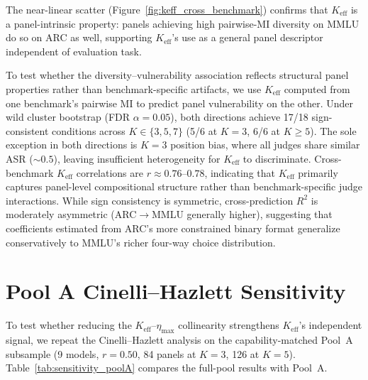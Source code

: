 The near-linear scatter (Figure~\ref{fig:keff_cross_benchmark}) confirms that $K_{\mathrm{eff}}$ is a panel-intrinsic property: panels achieving high pairwise-MI diversity on MMLU do so on ARC as well, supporting $K_{\mathrm{eff}}$'s use as a general panel descriptor independent of evaluation task.

To test whether the diversity--vulnerability association reflects structural panel properties rather than benchmark-specific artifacts, we use $K_{\mathrm{eff}}$ computed from one benchmark's pairwise MI to predict panel vulnerability on the other. Under wild cluster bootstrap (FDR $\alpha{=}0.05$), both directions achieve 17/18 sign-consistent conditions across $K \in \{3, 5, 7\}$ (5/6 at $K{=}3$, 6/6 at $K{\geq}5$). The sole exception in both directions is $K{=}3$ position bias, where all judges share similar ASR (${\sim}0.5$), leaving insufficient heterogeneity for $K_{\mathrm{eff}}$ to discriminate. Cross-benchmark $K_{\mathrm{eff}}$ correlations are $r{\approx}0.76$--$0.78$, indicating that $K_{\mathrm{eff}}$ primarily captures panel-level compositional structure rather than benchmark-specific judge interactions. While sign consistency is symmetric, cross-prediction $R^2$ is moderately asymmetric (ARC$\to$MMLU generally higher), suggesting that coefficients estimated from ARC's more constrained binary format generalize conservatively to MMLU's richer four-way choice distribution.

\FloatBarrier
\section{Pool A Cinelli--Hazlett Sensitivity}
\label{app:sensitivity_poolA}

To test whether reducing the $K_{\mathrm{eff}}$--$\eta_{\max}$ collinearity strengthens $K_{\mathrm{eff}}$'s independent signal, we repeat the Cinelli--Hazlett analysis on the capability-matched Pool~A subsample (9 models, $r{=}0.50$, 84 panels at $K{=}3$, 126 at $K{=}5$). Table~\ref{tab:sensitivity_poolA} compares the full-pool results with Pool~A.

